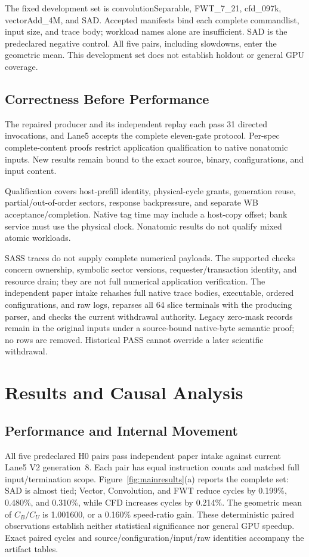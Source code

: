 \documentclass[conference,letterpaper]{IEEEtran}
\begin{document}
The fixed development set is convolutionSeparable, FWT\_7\_21, cfd\_097k, vectorAdd\_4M, and SAD. Accepted manifests bind each complete commandlist, input size, and trace body; workload names alone are insufficient. SAD is the predeclared negative control. All five pairs, including slowdowns, enter the geometric mean. This development set does not establish holdout or general GPU coverage.

\subsection{Correctness Before Performance}
The repaired producer and its independent replay each pass 31 directed invocations, and Lane5 accepts the complete eleven-gate protocol. Per-spec complete-content proofs restrict application qualification to native nonatomic inputs. New results remain bound to the exact source, binary, configurations, and input content.

Qualification covers host-prefill identity, physical-cycle grants, generation reuse, partial/out-of-order sectors, response backpressure, and separate WB acceptance/completion. Native tag time may include a host-copy offset; bank service must use the physical clock. Nonatomic results do not qualify mixed atomic workloads.

SASS traces do not supply complete numerical payloads. The supported checks concern ownership, symbolic sector versions, requester/transaction identity, and resource drain; they are not full numerical application verification. The independent paper intake rehashes full native trace bodies, executable, ordered configurations, and raw logs, reparses all 64 slice terminals with the producing parser, and checks the current withdrawal authority. Legacy zero-mask records remain in the original inputs under a source-bound native-byte semantic proof; no rows are removed. Historical PASS cannot override a later scientific withdrawal.

\section{Results and Causal Analysis}
\subsection{Performance and Internal Movement}
All five predeclared H0 pairs pass independent paper intake against current Lane5 V2 generation~8. Each pair has equal instruction counts and matched full input/termination scope. Figure~\ref{fig:mainresults}(a) reports the complete set: SAD is almost tied; Vector, Convolution, and FWT reduce cycles by 0.199\%, 0.480\%, and 0.310\%, while CFD increases cycles by 0.214\%. The geometric mean of $C_B/C_U$ is 1.001600, or a 0.160\% speed-ratio gain. These deterministic paired observations establish neither statistical significance nor general GPU speedup. Exact paired cycles and source/configuration/input/raw identities accompany the artifact tables.
\end{document}
